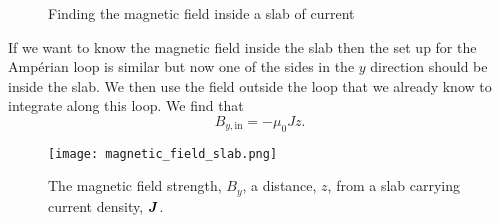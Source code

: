     \begin{figure}[ht]
        \centering
        \caption{Finding the magnetic field inside a slab of current}
    \end{figure}
    If we want to know the magnetic field inside the slab then the set up for the Amp\'erian loop is similar but now one of the sides in the \(y\) direction should be inside the slab.
    We then use the field outside the loop that we already know to integrate along this loop.
    We find that
    \[B_{y,\text{in}} = -\mu_0Jz.\]
    \begin{figure}[ht]
        \centering
        \texttt{[image: magnetic\_field\_slab.png]}
        \caption{The magnetic field strength, \(B_y\), a distance, \(z\), from a slab carrying current density, \(\bm{J}\).}
    \end{figure}


